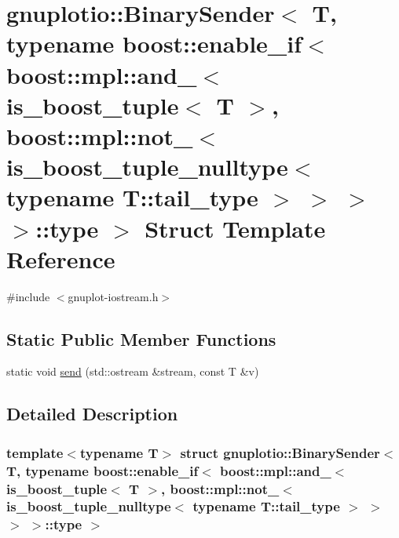 \hypertarget{structgnuplotio_1_1_binary_sender_3_01_t_00_01typename_01boost_1_1enable__if_3_01boost_1_1mpl_1_916ff7a758aa0b8917fd3b30ff275f06}{}\section{gnuplotio\+:\+:Binary\+Sender$<$ T, typename boost\+:\+:enable\+\_\+if$<$ boost\+:\+:mpl\+:\+:and\+\_\+$<$ is\+\_\+boost\+\_\+tuple$<$ T $>$, boost\+:\+:mpl\+:\+:not\+\_\+$<$ is\+\_\+boost\+\_\+tuple\+\_\+nulltype$<$ typename T\+:\+:tail\+\_\+type $>$ $>$ $>$ $>$\+:\+:type $>$ Struct Template Reference}
\label{structgnuplotio_1_1_binary_sender_3_01_t_00_01typename_01boost_1_1enable__if_3_01boost_1_1mpl_1_916ff7a758aa0b8917fd3b30ff275f06}


{\ttfamily \#include $<$gnuplot-\/iostream.\+h$>$}

\subsection*{Static Public Member Functions}
\begin{DoxyCompactItemize}
\item 
static void \hyperlink{structgnuplotio_1_1_binary_sender_3_01_t_00_01typename_01boost_1_1enable__if_3_01boost_1_1mpl_1_916ff7a758aa0b8917fd3b30ff275f06_a90bdbe9d299646a871882da19fdb30a9}{send} (std\+::ostream \&stream, const T \&v)
\end{DoxyCompactItemize}


\subsection{Detailed Description}
\subsubsection*{template$<$typename T$>$\newline
struct gnuplotio\+::\+Binary\+Sender$<$ T, typename boost\+::enable\+\_\+if$<$ boost\+::mpl\+::and\+\_\+$<$ is\+\_\+boost\+\_\+tuple$<$ T $>$, boost\+::mpl\+::not\+\_\+$<$ is\+\_\+boost\+\_\+tuple\+\_\+nulltype$<$ typename T\+::tail\+\_\+type $>$ $>$ $>$ $>$\+::type $>$}



